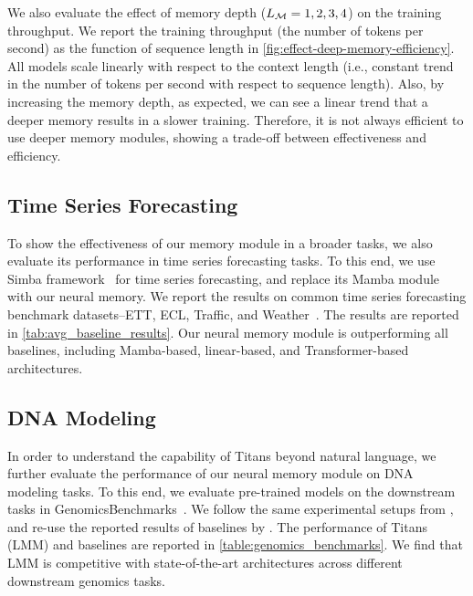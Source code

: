 We also evaluate the effect of memory depth ($L_{\mathcal{M}} = 1, 2, 3, 4$) on the training throughput. We report the training throughput (the number of tokens per second) as the function of sequence length in \autoref{fig:effect-deep-memory-efficiency}. All models scale linearly with respect to the context length (i.e., constant trend in the number of tokens per second with respect to sequence length). Also, by increasing the memory depth, as expected, we can see a linear trend that a deeper memory results in a slower training. Therefore, it is not always efficient to use deeper memory modules, showing a trade-off between effectiveness and efficiency. 




\vspace{2ex}
\subsection{Time Series Forecasting}\label{sec:exp-timeseries}
To show the effectiveness of our memory module in a broader tasks, we also evaluate its performance in time series forecasting tasks. To this end, we use Simba framework~\citep{patro2024simba} for time series forecasting, and replace its Mamba module with our neural memory. We report the results on common time series forecasting benchmark datasets–ETT, ECL, Traffic, and Weather~\citep{zhou2021informer}. The results are reported in \autoref{tab:avg_baseline_results}. Our neural memory module is outperforming all baselines, including Mamba-based, linear-based, and Transformer-based architectures. 






\subsection{DNA Modeling}\label{sec:exp-DNA}
In order to understand the capability of Titans beyond natural language, we further evaluate the performance of our neural memory module on DNA modeling tasks. To this end, we evaluate pre-trained models on the downstream tasks in GenomicsBenchmarks~\citep{grevsova2023genomic}. We follow the same experimental setups from \citet{nguyen2024hyenadna}, and re-use the reported results of baselines by \citet{arora2024simple}. The performance of Titans (LMM) and baselines are reported in \autoref{table:genomics_benchmarks}.  We find that LMM is competitive with state-of-the-art architectures across different downstream genomics tasks.





